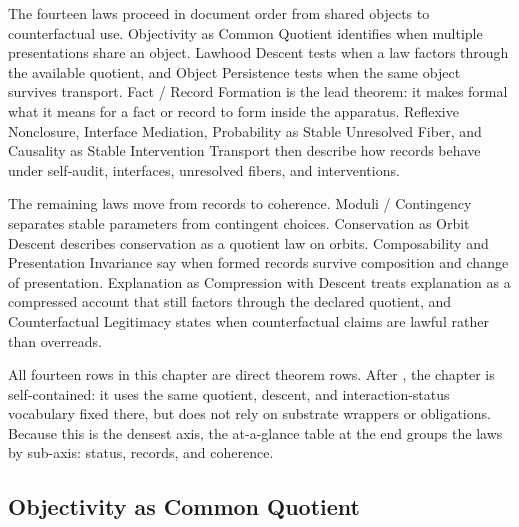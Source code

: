 \documentclass[11pt]{article}
\theoremstyle{definition}
\begin{document}
The fourteen laws proceed in document order from shared objects to
counterfactual use.  Objectivity as Common Quotient identifies when
multiple presentations share an object.  Lawhood Descent tests when a
law factors through the available quotient, and Object Persistence
tests when the same object survives transport.  Fact / Record
Formation is the lead theorem: it makes formal what it means for a
fact or record to form inside the apparatus.  Reflexive Nonclosure,
Interface Mediation, Probability as Stable Unresolved Fiber, and
Causality as Stable Intervention Transport then describe how records
behave under self-audit, interfaces, unresolved fibers, and
interventions.

The remaining laws move from records to coherence.  Moduli /
Contingency separates stable parameters from contingent choices.
Conservation as Orbit Descent describes conservation as a quotient
law on orbits.  Composability and Presentation Invariance say when
formed records survive composition and change of presentation.
Explanation as Compression with Descent treats explanation as a
compressed account that still factors through the declared quotient,
and Counterfactual Legitimacy states when counterfactual claims are
lawful rather than overreads.

All fourteen rows in this chapter are direct theorem rows.  After
, the chapter is self-contained: it uses the same
quotient, descent, and interaction-status vocabulary fixed there, but
does not rely on substrate wrappers or obligations.  Because this is
the densest axis, the at-a-glance table at the end groups the laws by
sub-axis: status, records, and coherence.

\subsection{Objectivity as Common Quotient}\label{sec:status-records-coherence:objectivity}
\end{document}

